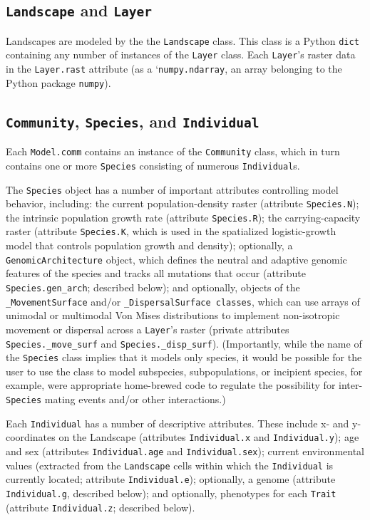﻿\documentclass{article}
\begin{document}
\subsection{\texttt{Landscape} and \texttt{Layer}}
Landscapes are modeled by the the \texttt{Landscape} class.
This class is a Python \texttt{dict} containing any number of instances of the \texttt{Layer} class.
Each \texttt{Layer}'s raster data in the \texttt{Layer.rast} attribute
(as a `\texttt{numpy.ndarray}, an array belonging to the Python package \texttt{numpy}).


\subsection{\texttt{Community}, \texttt{Species}, and \texttt{Individual}}
Each \texttt{Model.comm} contains an instance of the \texttt{Community} class, which
in turn contains one or more \texttt{Species} consisting of numerous \texttt{Individual}s.


The \texttt{Species} object has a number of important attributes controlling
model behavior, including: the current population-density raster
(attribute \texttt{Species.N});
the intrinsic population growth rate (attribute \texttt{Species.R});
the carrying-capacity raster (attribute \texttt{Species.K}, which is used in
the spatialized logistic-growth model that controls population growth and density); 
optionally, a \texttt{GenomicArchitecture} object, which defines the
neutral and adaptive genomic features of the species and tracks all mutations that occur
(attribute \texttt{Species.gen\_arch}; described below);
and optionally, objects of the \texttt{\_MovementSurface} and/or
\texttt{\_DispersalSurface classes}, which can use arrays of unimodal or multimodal
Von Mises distributions to implement non-isotropic movement or dispersal across a
\texttt{Layer}'s raster (private attributes \texttt{Species.\_move\_surf} and
\texttt{Species.\_disp\_surf}).
(Importantly, while the name of the \texttt{Species} class implies that
it models only species, it would be possible for the user to use the class to model
subspecies, subpopulations, or incipient species, for example, were appropriate
home-brewed code to regulate the possibility for inter-\texttt{Species} mating events
and/or other interactions.)

Each \texttt{Individual} has a number of descriptive attributes. These include
x- and y-coordinates on the Landscape (attributes \texttt{Individual.x}
and \texttt{Individual.y}); age and sex (attributes \texttt{Individual.age} and
\texttt{Individual.sex}); current environmental values (extracted from the
\texttt{Landscape} cells within which the \texttt{Individual} is currently located;
attribute \texttt{Individual.e}); optionally, a genome (attribute
\texttt{Individual.g}, described below); and optionally, phenotypes for each
\texttt{Trait} (attribute \texttt{Individual.z}; described below).
\end{document}
